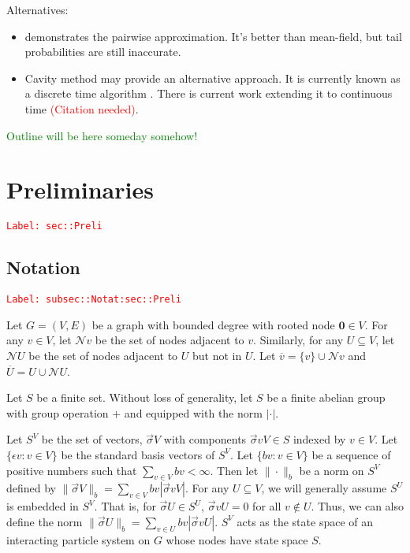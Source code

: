 \documentclass[12pt]{article}
\newcommand{\mc}{\mathcal}
\newcommand{\ov}{\overline}
\newcommand{\ep}{\epsilon}
\newcommand{\tr}{\textcolor{red}}
\newcommand{\tg}{\textcolor{green}}
\newcommand{\labe}[1]{\tr{\texttt{Label: #1}}}
\newcommand{\ind}{\hspace{24pt}}
\newcommand{\neigh}{\mc{N}}					%
\renewcommand{\root}{\mathbf{0}}				%
\renewcommand{\v}{v}							%
\renewcommand{\U}{U}							%
\renewcommand{\S}{S}							%
\newcommand{\s}{\sigma}							%
\newcommand{\sv}{\vec{\s}}						%
\renewcommand{\b}{b}							%
\newcommand{\ev}{\ep}							%
\newcommand{\cl}{\ov}							%
\renewcommand{\G}{G}								%
\newcommand{\V}{V}									%
\newcommand{\E}{E}									%
\newcommand{\XState}[1]{\S^{#1}}				%
\begin{document}
Alternatives:

\begin{itemize}
\item \cite{Gas15} demonstrates the pairwise approximation. It's better than mean-field, but tail probabilities are still inaccurate.

\item Cavity method may provide an alternative approach. It is currently known as a discrete time algorithm \cite{Lac15}\cite{KanMon11}. There is current work extending it to continuous time \tr{(Citation needed)}.
\end{itemize}

\tg{Outline will be here someday somehow!}


\section{Preliminaries}
\label{sec::Preli}\labe{sec::Preli}

\subsection{Notation}
\label{subsec::Notat:sec::Preli}\labe{subsec::Notat:sec::Preli}

Let \(\G = (\V,\E)\) be a graph with bounded degree with rooted node \(\root \in \V\). For any \(\v \in \V\), let \(\neigh{\v}\) be the set of nodes adjacent to \(\v\). Similarly, for any \(\U \subseteq \V\), let \(\neigh{\U}\) be the set of nodes adjacent to \(\U\) but not in \(\U\). Let \(\cl{\v} = \{\v\}\cup\neigh{\v}\) and \(\cl{\U} = \U\cup \neigh{\U}\). 

\ind Let \(\S\) be a finite set. Without loss of generality, let \(S\) be a finite abelian group with group operation \(+\) and equipped with the norm \(|\cdot|\). 

\ind Let \(\S^\V\) be the set of vectors, \(\sv{}{\V}\) with components \(\sv{\v}{\V} \in \S\) indexed by \(\v\in \V\). Let \(\{\ev{\v}: \v\in \V\}\) be the standard basis vectors of \(\S^\V\). Let \(\{\b{\v}:\v\in \V\}\) be a sequence of positive numbers such that \(\sum_{\v\in\V} \b{\v} < \infty\). Then let \(\|\cdot\|_{\b{}}\) be a norm on \(\S^\V\) defined by \(\|\sv{}{\V}\|_{\b{}} = \sum_{\v\in\V} \b{\v}|\sv{\v}{\V}|\). For any \(\U\subseteq \V\), we will generally assume \(\S^\U\) is embedded in \(\S^\V\). That is, for \(\sv{}{\U}\in \S^\U\), \(\sv{\v}{\U} = 0\) for all \(\v\notin\U\). Thus, we can also define the norm \(\|\sv{}{\U}\|_{\b{}} = \sum_{\v\in\U} \b{\v}|\sv{\v}{\U}|\). \(\S^\V\) acts as the state space of an interacting particle system on \(\G\) whose nodes have state space \(\S\).
\end{document}
